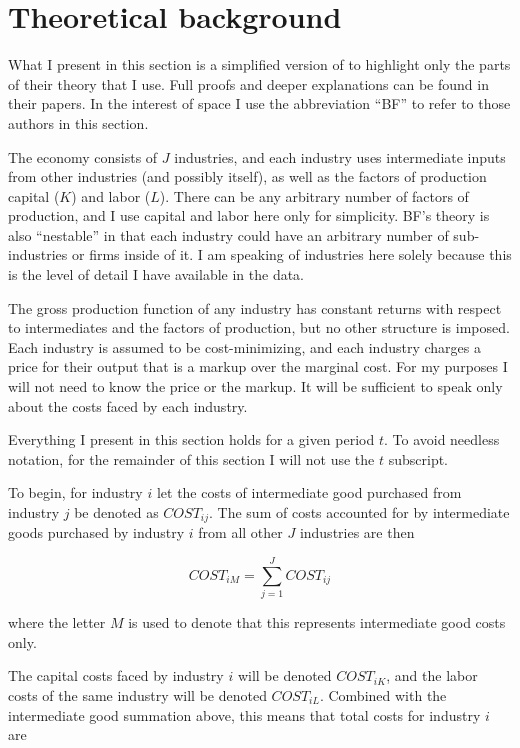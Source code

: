 \documentclass[11pt]{article}
\begin{document}
\section{Theoretical background}
What I present in this section is a simplified version of \cite{bfshortnote,bfprodge} to highlight only the parts of their theory that I use. Full proofs and deeper explanations can be found in their papers. In the interest of space I use the abbreviation ``BF'' to refer to those authors in this section.

The economy consists of $J$ industries, and each industry uses intermediate inputs from other industries (and possibly itself), as well as the factors of production capital ($K$) and labor ($L$). There can be any arbitrary number of factors of production, and I use capital and labor here only for simplicity. BF's theory is also ``nestable'' in that each industry could have an arbitrary number of sub-industries or firms inside of it. I am speaking of industries here solely because this is the level of detail I have available in the data. 

The gross production function of any industry has constant returns with respect to intermediates and the factors of production, but no other structure is imposed. Each industry is assumed to be cost-minimizing, and each industry charges a price for their output that is a markup over the marginal cost. For my purposes I will not need to know the price or the markup. It will be sufficient to speak only about the costs faced by each industry.

Everything I present in this section holds for a given period $t$. To avoid needless notation, for the remainder of this section I will not use the $t$ subscript. 

To begin, for industry $i$ let the costs of intermediate good purchased from industry $j$ be denoted as $COST_{ij}$. The sum of costs accounted for by intermediate goods purchased by industry $i$ from all other $J$ industries are then

\begin{equation}
	COST_{iM} = \sum_{j=1}^{J} COST_{ij}
\end{equation}

where the letter $M$ is used to denote that this represents intermediate good costs only.

The capital costs faced by industry $i$ will be denoted $COST_{iK}$, and the labor costs of the same industry will be denoted $COST_{iL}$. Combined with the intermediate good summation above, this means that total costs for industry $i$ are
\end{document}
